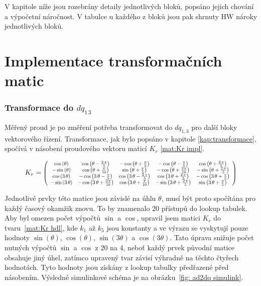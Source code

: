 V kapitole níže jsou rozebrány detaily jednotlivých bloků, popsáno jejich chování a výpočetní náročnost. V tabulce u každého z bloků jsou pak shrnuty HW nároky jednotlivých bloků.



\section{Implementace transformačních matic}

\subsubsection{Transformace do $dq_{1\,3}$}
Měřený proud je po změření potřeba transformovat do $dq_{1,3}$ pro další bloky vektorového řízení. Transformace, jak bylo popsáno v kapitole \ref{kap:transformace}, spočívá v násobení proudového vektoru maticí $K_r$ \ref{mat:Kr impl}.

\begin{equation}
\label{mat:Kr impl}
 K_r=\resizebox{0.8\textwidth}{!}{$
    \left( \begin{array}{ccccc}
    \cos \left(\theta \right) & \cos \left(\theta -\frac{2\,\pi }{5}\right) & -\cos \left(\theta +\frac{\pi }{5}\right) & -\cos \left(\theta -\frac{\pi }{5}\right) & \cos \left(\theta +\frac{2\,\pi }{5}\right)\\
    -\sin \left(\theta \right) & \cos \left(\theta +\frac{\pi }{10}\right) & \sin \left(\theta +\frac{\pi }{5}\right) & -\cos \left(\theta +\frac{3\,\pi }{10}\right) & -\sin \left(\theta +\frac{2\,\pi }{5}\right)\\
    \cos \left(3\,\theta \right) & -\cos \left(3\,\theta -\frac{\pi }{5}\right) & \cos \left(3\,\theta -\frac{2\,\pi }{5}\right) & \cos \left(3\,\theta +\frac{2\,\pi }{5}\right) & -\cos \left(3\,\theta +\frac{\pi }{5}\right)\\
    -\sin \left(3\,\theta \right) & -\cos \left(3\,\theta +\frac{3\,\pi }{10}\right) & \cos \left(3\,\theta +\frac{\pi }{10}\right) & -\sin \left(3\,\theta +\frac{2\,\pi }{5}\right) & \sin \left(3\,\theta +\frac{\pi }{5}\right)
\end{array} \right)
$}
\end{equation} 

Jednotlivé prvky této matice jsou závislé na úhlu $\theta$, musí být proto spočítána pro každý časový okamžik znovu. To by znamenalo 20 přístupů do lookup tabulek. Aby byl omezen počet výpočtů $\sin$ a $\cos$, upravil jsem  matici $K_r$  do tvaru~\ref{mat:Kr hdl}, kde $k_1$ až $k_{5}$ jsou konstanty a ve výrazu se vyskytují pouze hodnoty $\sin(\theta)$, $\cos(\theta)$, $\sin(3\theta)$ a $\cos(3\theta)$. Tato úprava snižuje počet nutných výpočtů $\sin$ a $\cos$ z 20 na 4, neboť každý prvek původní matice obsahuje jiný úhel, zatímco upravený tvar závisí výhradně na těchto čtyřech hodnotách. Tyto hodnoty jsou získány z lookup tabulky předřazené před násobením. Výsledné simulinkové schéma je na obrázku~\ref{fig: ad2dq simulink}.


